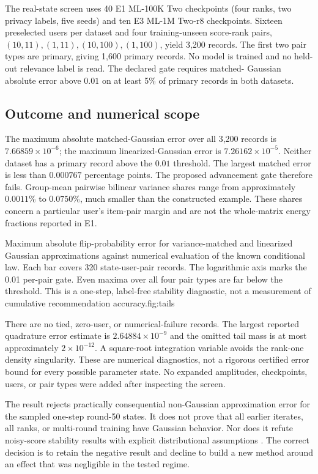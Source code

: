 The real-state screen uses 40 E1 ML-100K Two checkpoints (four ranks, two
privacy labels, five seeds) and ten E3 ML-1M Two-r8 checkpoints. Sixteen
preselected users per dataset and four training-unseen score-rank pairs,
$(10,11),(1,11),(10,100),(1,100)$, yield 3,200 records. The first two pair
types are primary, giving 1,600 primary records. No model is trained and
no held-out relevance label is read. The declared gate requires matched-
Gaussian absolute error above $0.01$ on at least 5\% of primary records
in both datasets.

\subsection{Outcome and numerical scope}
The maximum absolute matched-Gaussian error over all 3,200 records is
$7.66859\times10^{-6}$; the maximum linearized-Gaussian error is
$7.26162\times10^{-5}$. Neither dataset has a primary record above the
$0.01$ threshold. The largest matched error is less than $0.000767$
percentage points. The proposed advancement gate therefore fails.
Group-mean pairwise bilinear variance shares range from approximately
$0.0011$\% to $0.0750$\%, much smaller than the constructed example.
These shares concern a particular user's item-pair margin and are not
the whole-matrix energy fractions reported in E1.

{Maximum absolute flip-probability error for variance-matched and linearized
Gaussian approximations against numerical evaluation of the known conditional
law. Each bar covers 320 state-user-pair records. The logarithmic axis marks
the 0.01 per-pair gate. Even maxima over all four pair types are far below
the threshold. This is a one-step, label-free stability diagnostic, not a
measurement of cumulative recommendation accuracy.}{fig:tails}

There are no tied, zero-user, or numerical-failure records. The largest
reported quadrature error estimate is $2.64884\times10^{-9}$ and the omitted
tail mass is at most approximately $2\times10^{-12}$. A square-root
integration variable avoids the rank-one density singularity. These are
numerical diagnostics, not a rigorous certified error bound for every
possible parameter state. No expanded amplitudes, checkpoints, users,
or pair types were added after inspecting the screen.

The result rejects practically consequential non-Gaussian approximation
error for the sampled one-step round-50 states. It does not prove that all
earlier iterates, all ranks, or multi-round training have Gaussian behavior.
Nor does it refute noisy-score stability results with explicit distributional
assumptions \citep{urmian2026slate}. The correct decision is to retain the
negative result and decline to build a new method around an effect that
was negligible in the tested regime.
\FloatBarrier
